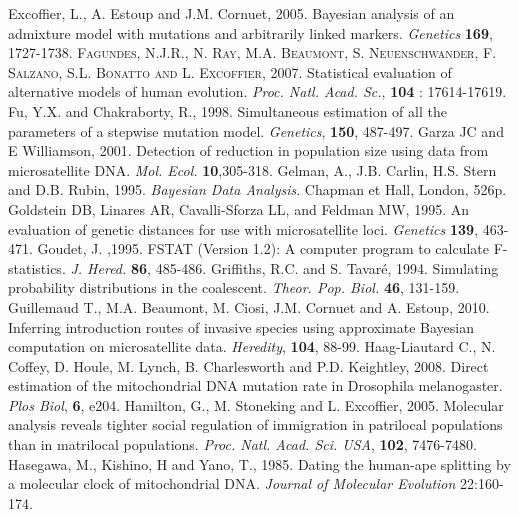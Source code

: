 \begin{thebibliography}{a}
 Excoffier, L., A. Estoup and J.M. Cornuet, 2005.
 Bayesian analysis of an admixture model with mutations and arbitrarily linked markers. \emph{Genetics} \textbf{169}, 1727-1738.
 \textsc{Fagundes, N.J.R., N. Ray, M.A. Beaumont, S. Neuenschwander, F. Salzano, S.L. Bonatto and L. Excoffier}, 2007. Statistical evaluation of alternative models of human evolution. \emph{Proc. Natl. Acad. Sc.}, \textbf{104} : 17614-17619.
 Fu, Y.X. and
Chakraborty, R., 1998. Simultaneous estimation of all the parameters
of a stepwise mutation model. \emph{Genetics}, \textbf{150},
487-497.
 Garza JC and E Williamson, 2001. Detection of reduction in population size using data from microsatellite DNA. \emph{Mol. Ecol.}   \textbf{10},305-318.
 Gelman, A., J.B. Carlin, H.S. Stern and D.B. Rubin, 1995. \emph{Bayesian Data Analysis}. Chapman et Hall, London, 526p. 
 Goldstein DB, Linares AR, Cavalli-Sforza LL, and Feldman MW, 1995. An evaluation of genetic distances for use with microsatellite loci. \emph{Genetics} \textbf{139}, 463-471.
  Goudet, J. ,1995. FSTAT (Version 1.2): A computer program to calculate F- statistics. \emph{J. Hered.} \textbf{86},  485-486.
  Griffiths, R.C. and S. Tavar\'e, 1994. Simulating probability distributions in the coalescent. \emph{Theor. Pop. Biol.} \textbf{46}, 131-159.
Guillemaud T., M.A. Beaumont, M. Ciosi, J.M. Cornuet and A. Estoup, 2010. Inferring introduction routes of invasive species using approximate Bayesian computation on microsatellite data. \emph{Heredity}, \textbf{104}, 88-99.
 Haag-Liautard C., N. Coffey, D. Houle, M. Lynch, B. Charlesworth and P.D. Keightley, 2008. Direct estimation of the mitochondrial DNA mutation rate in Drosophila melanogaster. \emph{Plos Biol}, \textbf{6}, e204.
  Hamilton, G., M. Stoneking and L. Excoffier, 2005. Molecular analysis reveals tighter social regulation of immigration in patrilocal populations than in matrilocal populations. \emph{Proc. Natl. Acad. Sci. USA}, \textbf{102}, 7476-7480.
 Hasegawa, M., Kishino, H and Yano, T., 1985. Dating the human-ape splitting by a molecular clock of mitochondrial DNA. \emph{Journal of Molecular Evolution} 22:160-174.

\end{thebibliography}
